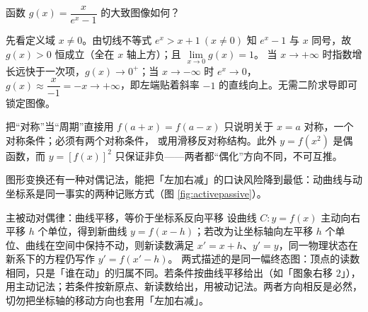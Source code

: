 \begin{explore}
\begin{example}[用奇偶性速判函数图像]
函数 $g(x)=\dfrac{x}{e^x-1}$ 的大致图像如何？
\begin{solution}
先看定义域 $x\neq0$。由切线不等式 $e^x>x+1\ (x\neq0)$ 知 $e^x-1$ 与 $x$ 同号，故 $g(x)>0$ 恒成立（全在 $x$ 轴上方）；且 $\lim\limits_{x\to0}g(x)=1$。
当 $x\to+\infty$ 时指数增长远快于一次项，$g(x)\to0^+$；当 $x\to-\infty$ 时 $e^x\to0$，$g(x)\approx\dfrac{x}{-1}=-x\to+\infty$，即左端贴着斜率 $-1$ 的直线向上。无需二阶求导即可锁定图像。
\end{solution}
\end{example}

\begin{commonerror}{把“对称”当“周期”直接用}
$f(a+x)=f(a-x)$ 只说明关于 $x=a$ 对称，一个对称条件；必须有两个对称条件，
或用滑移反对称结构。此外 $y=f(x^2)$ 是偶函数，而 $y=[f(x)]^2$ 只保证非负——两者都“偶化”方向不同，不可互推。
\end{commonerror}

图形变换还有一种对偶记法，能把「左加右减」的口诀风险降到最低：动曲线与动坐标系是同一事实的两种记账方式（图 \ref{fig:activepassive}）。

\begin{methodbox}{主被动对偶律：曲线平移，等价于坐标系反向平移}
设曲线 $C:y=f(x)$ 主动向右平移 $h$ 个单位，得到新曲线 $y=f(x-h)$；若改为让坐标轴向左平移 $h$ 个单位、曲线在空间中保持不动，则新读数满足 $x'=x+h$、$y'=y$，同一物理状态在新系下的方程仍写作 $y'=f(x'-h)$。
两式描述的是同一幅终态图：顶点的读数相同，只是「谁在动」的归属不同。若条件按曲线平移给出（如「图象右移 $2$」），用主动记法；若条件按新原点、新读数给出，用被动记法。两者方向相反是必然，切勿把坐标轴的移动方向也套用「左加右减」。
\end{methodbox}


\end{explore}
